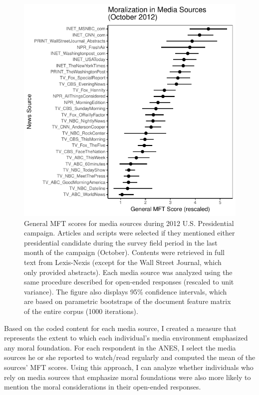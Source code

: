 \documentclass[12pt]{article}
\begin{document}
\begin{figure}[ht]\centering
\includegraphics{../calc/fig/media_desc.pdf}
\caption{General MFT scores for media sources during 2012 U.S. Presidential campaign. Articles and scripts were selected if they mentioned either presidential candidate during the survey field period in the last month of the campaign (October). Contents were retrieved in full text from Lexis-Nexis (except for the Wall Street Journal, which only provided abstracts). Each media source was analyzed using the same procedure described for open-ended responses (rescaled to unit variance). The figure also displays 95\% confidence intervals, which are based on parametric bootstraps of the document feature matrix of the entire corpus (1000 iterations).}\label{fig:media_desc}
\end{figure}


Based on the coded content for each media source, I created a measure that represents the extent to which each individual's media environment emphasized any moral foundation. For each respondent in the ANES, I select the media sources he or she reported to watch/read regularly and computed the mean of the sources' MFT scores. Using this approach, I can analyze whether individuals who rely on media sources that emphasize moral foundations were also more likely to mention the moral considerations in their open-ended responses.
\end{document}
